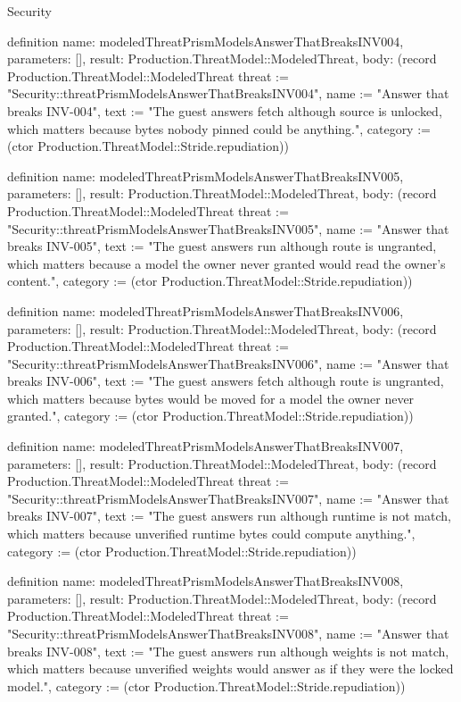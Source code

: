 \begin{lexlean}{Security}
\begin{semanticmodule}
definition{
  name: modeledThreatPrismModelsAnswerThatBreaksINV004,
  parameters: [],
  result: Production.ThreatModel::ModeledThreat,
  body: (record Production.ThreatModel::ModeledThreat {threat := "Security::threatPrismModelsAnswerThatBreaksINV004", name := "Answer that breaks INV-004", text := "The guest answers fetch although source is unlocked, which matters because bytes nobody pinned could be anything.", category := (ctor Production.ThreatModel::Stride.repudiation)})
}

definition{
  name: modeledThreatPrismModelsAnswerThatBreaksINV005,
  parameters: [],
  result: Production.ThreatModel::ModeledThreat,
  body: (record Production.ThreatModel::ModeledThreat {threat := "Security::threatPrismModelsAnswerThatBreaksINV005", name := "Answer that breaks INV-005", text := "The guest answers run although route is ungranted, which matters because a model the owner never granted would read the owner's content.", category := (ctor Production.ThreatModel::Stride.repudiation)})
}

definition{
  name: modeledThreatPrismModelsAnswerThatBreaksINV006,
  parameters: [],
  result: Production.ThreatModel::ModeledThreat,
  body: (record Production.ThreatModel::ModeledThreat {threat := "Security::threatPrismModelsAnswerThatBreaksINV006", name := "Answer that breaks INV-006", text := "The guest answers fetch although route is ungranted, which matters because bytes would be moved for a model the owner never granted.", category := (ctor Production.ThreatModel::Stride.repudiation)})
}

definition{
  name: modeledThreatPrismModelsAnswerThatBreaksINV007,
  parameters: [],
  result: Production.ThreatModel::ModeledThreat,
  body: (record Production.ThreatModel::ModeledThreat {threat := "Security::threatPrismModelsAnswerThatBreaksINV007", name := "Answer that breaks INV-007", text := "The guest answers run although runtime is not match, which matters because unverified runtime bytes could compute anything.", category := (ctor Production.ThreatModel::Stride.repudiation)})
}

definition{
  name: modeledThreatPrismModelsAnswerThatBreaksINV008,
  parameters: [],
  result: Production.ThreatModel::ModeledThreat,
  body: (record Production.ThreatModel::ModeledThreat {threat := "Security::threatPrismModelsAnswerThatBreaksINV008", name := "Answer that breaks INV-008", text := "The guest answers run although weights is not match, which matters because unverified weights would answer as if they were the locked model.", category := (ctor Production.ThreatModel::Stride.repudiation)})
}


\end{semanticmodule}
\end{lexlean}
